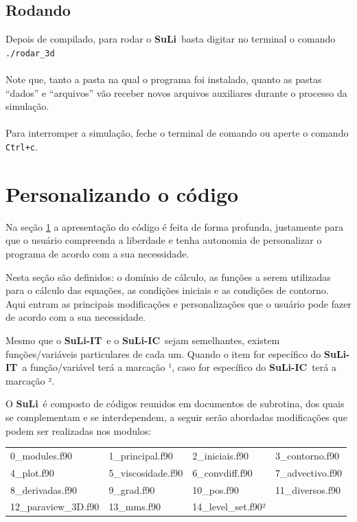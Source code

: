\documentclass[12pt, a4paper]{article}
\newcommand{\SL}{{\bf SuLi}}
\newcommand{\SLIT}{{\bf SuLi-IT}}
\newcommand{\SLIC}{{\bf SuLi-IC}}
\begin{document}
\subsection{Rodando}

Depois de compilado, para rodar o \SL\ basta digitar no terminal o comando 
\verb!./rodar_3d! 
\\\\Note que, tanto a pasta na qual o programa foi instalado, quanto as pastas ``dados'' e ``arquivos'' vão receber novos arquivos auxiliares durante o processo da simulação.
\\\\Para interromper a simulação, feche o terminal de comando ou aperte o comando \verb!Ctrl+c!.


\newpage

\section{Personalizando o código}	\label{utilizando_o_codigo}

Na seção \ref{utilizando_o_codigo} a apresentação do código é feita de forma profunda, justamente para que o usuário compreenda a liberdade e tenha autonomia de personalizar o programa de acordo com a sua necessidade.

Nesta seção são definidos: o domínio de cálculo, as funções a serem utilizadas para o cálculo das equações, as condições iniciais e as condições de contorno. Aqui entram as principais modificações e personalizações que o usuário pode fazer de acordo com a sua necessidade.

Mesmo que o \SLIT\ e o \SLIC\ sejam semelhantes, existem funções/variáveis particulares de cada um. Quando o item for específico do \SLIT\ a função/variável terá a marcação ¹, caso for específico do \SLIC\ terá a marcação ².

O \SL\ é composto de códigos reunidos em documentos de subrotina, dos quais se complementam e se interdependem, a seguir serão abordadas modificações que podem ser realizadas nos modulos:

\begin{table}[htb]
	\begin{center}
		\begin{tabular}{llll}
		0\_modules.f90 & 1\_principal.f90 & 2\_iniciais.f90 & 3\_contorno.f90 \\
		4\_plot.f90  & 5\_viscosidade.f90 & 6\_convdiff.f90 & 7\_advectivo.f90 \\
		8\_derivadas.f90 & 9\_grad.f90 & 10\_pos.f90 & 11\_diversos.f90 \\
		12\_paraview\_3D.f90 & 13\_mms.f90 & 14\_level\_set.f90² & \\
		\end{tabular}		
	\end{center}
\end{table}
\end{document}
